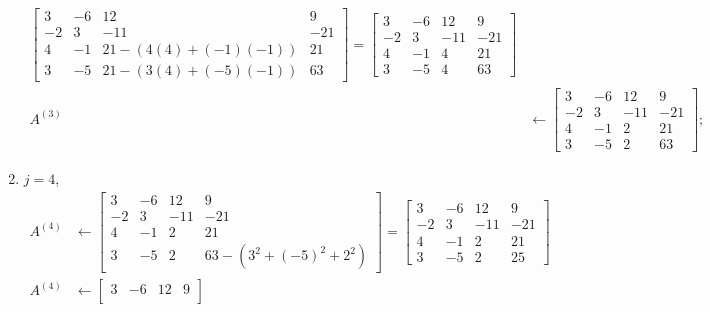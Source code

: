 \documentclass[a4paper,12pt, leqno, answers]{exam}
\begin{document}
\begin{questions}
\begin{solution}
\begin{enumerate}
\begin{align*}
\begin{bmatrix}
                        3 & -6 & 12 & 9 \\
                        -2 & 3 & -11 & -21 \\
                        4 & -1 & 21 - (4(4) + (-1)(-1))  & 21 \\
                        3 & -5 & 21 - (3(4) + (-5)(-1)) & 63
                    \end{bmatrix} = \begin{bmatrix}
                        3 & -6 & 12 & 9 \\
                        -2 & 3 & -11 & -21 \\
                        4 & -1 & 4  & 21 \\
                        3 & -5 & 4 & 63
                    \end{bmatrix} \\
                    A^{(3)} &\leftarrow \begin{bmatrix}
                        3 & -6 & 12 & 9 \\
                        -2 & 3 & -11 & -21 \\
                        4 & -1 & 2  & 21 \\
                        3 & -5 & 2 & 63
                    \end{bmatrix};
               \end{align*}
           \item $j = 4$,
               \begin{align*}
                   A^{(4)} &\leftarrow \begin{bmatrix}
                        3 & -6 & 12 & 9 \\
                        -2 & 3 & -11 & -21 \\
                        4 & -1 & 2  & 21 \\
                        3 & -5 & 2 & 63 - (3^2 + (-5)^2 + 2^2)
                    \end{bmatrix} = \begin{bmatrix}
                        3 & -6 & 12 & 9 \\
                        -2 & 3 & -11 & -21 \\
                        4 & -1 & 2  & 21 \\
                        3 & -5 & 2 & 25
                    \end{bmatrix} \\
                    A^{(4)} &\leftarrow \begin{bmatrix}
                        3 & -6 & 12 & 9 \\

\end{bmatrix}
\end{align*}
\end{enumerate}
\end{solution}
\end{questions}
\end{document}
